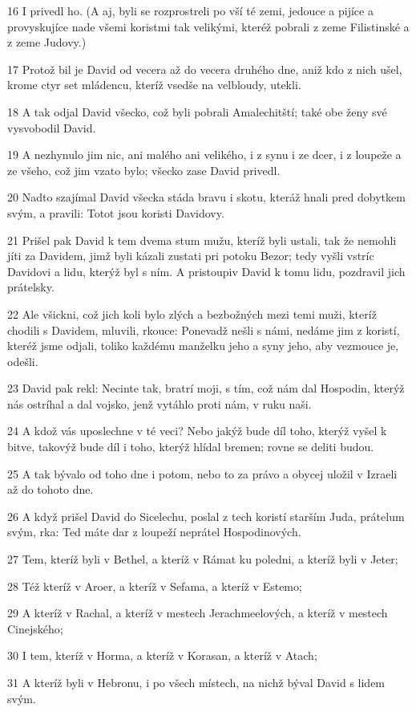 \par 16 I privedl ho. (A aj, byli se rozprostreli po vší té zemi, jedouce a pijíce a provyskujíce nade všemi koristmi tak velikými, kteréž pobrali z zeme Filistinské a z zeme Judovy.)
\par 17 Protož bil je David od vecera až do vecera druhého dne, aniž kdo z nich ušel, krome ctyr set mládencu, kteríž vsedše na velbloudy, utekli.
\par 18 A tak odjal David všecko, což byli pobrali Amalechitští; také obe ženy své vysvobodil David.
\par 19 A nezhynulo jim nic, ani malého ani velikého, i z synu i ze dcer, i z loupeže a ze všeho, což jim vzato bylo; všecko zase David privedl.
\par 20 Nadto szajímal David všecka stáda bravu i skotu, kteráž hnali pred dobytkem svým, a pravili: Totot jsou koristi Davidovy.
\par 21 Prišel pak David k tem dvema stum mužu, kteríž byli ustali, tak že nemohli jíti za Davidem, jimž byli kázali zustati pri potoku Bezor; tedy vyšli vstríc Davidovi a lidu, kterýž byl s ním. A pristoupiv David k tomu lidu, pozdravil jich prátelsky.
\par 22 Ale všickni, což jich koli bylo zlých a bezbožných mezi temi muži, kteríž chodili s Davidem, mluvili, rkouce: Ponevadž nešli s námi, nedáme jim z koristí, kteréž jsme odjali, toliko každému manželku jeho a syny jeho, aby vezmouce je, odešli.
\par 23 David pak rekl: Necinte tak, bratrí moji, s tím, což nám dal Hospodin, kterýž nás ostríhal a dal vojsko, jenž vytáhlo proti nám, v ruku naši.
\par 24 A kdož vás uposlechne v té veci? Nebo jakýž bude díl toho, kterýž vyšel k bitve, takovýž bude díl i toho, kterýž hlídal bremen; rovne se deliti budou.
\par 25 A tak bývalo od toho dne i potom, nebo to za právo a obycej uložil v Izraeli až do tohoto dne.
\par 26 A když prišel David do Sicelechu, poslal z tech koristí starším Juda, prátelum svým, rka: Ted máte dar z loupeží neprátel Hospodinových.
\par 27 Tem, kteríž byli v Bethel, a kteríž v Rámat ku poledni, a kteríž byli v Jeter;
\par 28 Též kteríž v Aroer, a kteríž v Sefama, a kteríž v Estemo;
\par 29 A kteríž v Rachal, a kteríž v mestech Jerachmeelových, a kteríž v mestech Cinejského;
\par 30 I tem, kteríž v Horma, a kteríž v Korasan, a kteríž v Atach;
\par 31 A kteríž byli v Hebronu, i po všech místech, na nichž býval David s lidem svým.

